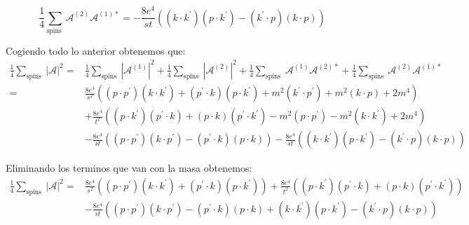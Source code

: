     \begin{equation}
      \frac{1}{4} \sum_{\text {spins }} \mathcal{A}^{(2)} \mathcal{A}^{(1) *}=-\frac{8 e^4}{s t}\left(\left(k \cdot k^{\prime}\right)\left(p \cdot k^{\prime}\right)-\left(k^{\prime} \cdot p\right)(k \cdot p)\right)
      \end{equation}

Cogiendo todo lo anterior obtenemos que: 
\begin{equation}
  \begin{aligned}
  \frac{1}{4} \sum_{\text {spins }}|\mathcal{A}|^2= & \frac{1}{4} \sum_{\text {spins }}\left|\mathcal{A}^{(1)}\right|^2+\frac{1}{4} \sum_{\text {spins }}\left|\mathcal{A}^{(2)}\right|^2+\frac{1}{4} \sum_{\text {spins }} \mathcal{A}^{(1)} \mathcal{A}^{(2) *}+\frac{1}{4} \sum_{\text {spins }} \mathcal{A}^{(2)} \mathcal{A}^{(1) *} \\
  = & \frac{8 e^4}{s^2}\left(\left(p \cdot p^{\prime}\right)\left(k \cdot k^{\prime}\right)+\left(p^{\prime} \cdot k\right)\left(p \cdot k^{\prime}\right)+m^2\left(k^{\prime} \cdot p^{\prime}\right)+m^2(k \cdot p)+2 m^4\right) \\
  & +\frac{8 e^4}{t^2}\left(\left(p \cdot k^{\prime}\right)\left(p^{\prime} \cdot k\right)+(p \cdot k)\left(p^{\prime} \cdot k^{\prime}\right)-m^2\left(p \cdot p^{\prime}\right)-m^2\left(k \cdot k^{\prime}\right)+2 m^4\right) \\
  & -\frac{8 e^4}{s t}\left(\left(p \cdot p^{\prime}\right)\left(k \cdot p^{\prime}\right)-\left(p^{\prime} \cdot k\right)(p \cdot k)\right)-\frac{8 e^4}{s t}\left(\left(k \cdot k^{\prime}\right)\left(p \cdot k^{\prime}\right)-\left(k^{\prime} \cdot p\right)(k \cdot p)\right)
  \end{aligned}
  \end{equation}

  Eliminando los terminos que van con la masa obtenemos: 
  \begin{equation}
    \begin{aligned}
    \frac{1}{4} \sum_{\text {spins }}|\mathcal{A}|^2= & \frac{8 e^4}{s^2}\left(\left(p \cdot p^{\prime}\right)\left(k \cdot k^{\prime}\right)+\left(p^{\prime} \cdot k\right)\left(p \cdot k^{\prime}\right)\right)+\frac{8 e^4}{t^2}\left(\left(p \cdot k^{\prime}\right)\left(p^{\prime} \cdot k\right)+(p \cdot k)\left(p^{\prime} \cdot k^{\prime}\right)\right) \\
    & -\frac{8 e^4}{s t}\left(\left(p \cdot p^{\prime}\right)\left(k \cdot p^{\prime}\right)-\left(p^{\prime} \cdot k\right)(p \cdot k)+\left(k \cdot k^{\prime}\right)\left(p \cdot k^{\prime}\right)-\left(k^{\prime} \cdot p\right)(k \cdot p)\right)
    \end{aligned}
    \end{equation}
